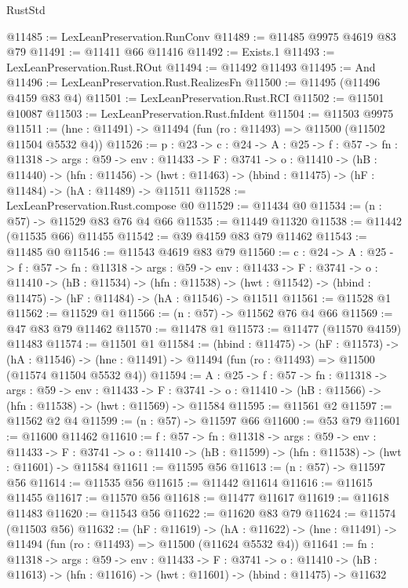 \begin{lexlean}{RustStd}
\begin{coremodule}
@11485 := LexLeanPreservation.RunConv
@11489 := @11485 @9975 @4619 @83 @79
@11491 := @11411 @66 @11416
@11492 := Exists.{1}
@11493 := LexLeanPreservation.Rust.ROut
@11494 := @11492 @11493
@11495 := And
@11496 := LexLeanPreservation.Rust.RealizesFn
@11500 := @11495 (@11496 @4159 @83 @4)
@11501 := LexLeanPreservation.Rust.RCI
@11502 := @11501 @10087
@11503 := LexLeanPreservation.Rust.fnIdent
@11504 := @11503 @9975
@11511 := (hne : @11491) -> @11494 (fun (ro : @11493) => @11500 (@11502 @11504 @5532 @4))
@11526 := {p : @23} ->
  {c : @24} ->
  {A : @25} ->
  {f : @57} ->
  {fn : @11318} ->
  {args : @59} ->
  {env : @11433} ->
  {F : @3741} ->
  {o : @11410} ->
  (hB : @11440) ->
  (hfn : @11456) -> (hwt : @11463) -> (hbind : @11475) -> (hF : @11484) -> (hA : @11489) -> @11511
@11528 := LexLeanPreservation.Rust.compose @0
@11529 := @11434 @0
@11534 := (n : @57) -> @11529 @83 @76 @4 @66
@11535 := @11449 @11320
@11538 := @11442 (@11535 @66) @11455
@11542 := @39 @4159 @83 @79 @11462
@11543 := @11485 @0
@11546 := @11543 @4619 @83 @79
@11560 := {c : @24} ->
  {A : @25} ->
  {f : @57} ->
  {fn : @11318} ->
  {args : @59} ->
  {env : @11433} ->
  {F : @3741} ->
  {o : @11410} ->
  (hB : @11534) ->
  (hfn : @11538) -> (hwt : @11542) -> (hbind : @11475) -> (hF : @11484) -> (hA : @11546) -> @11511
@11561 := @11528 @1
@11562 := @11529 @1
@11566 := (n : @57) -> @11562 @76 @4 @66
@11569 := @47 @83 @79 @11462
@11570 := @11478 @1
@11573 := @11477 (@11570 @4159) @11483
@11574 := @11501 @1
@11584 := (hbind : @11475) ->
  (hF : @11573) ->
  (hA : @11546) -> (hne : @11491) -> @11494 (fun (ro : @11493) => @11500 (@11574 @11504 @5532 @4))
@11594 := {A : @25} ->
  {f : @57} ->
  {fn : @11318} ->
  {args : @59} ->
  {env : @11433} ->
  {F : @3741} -> {o : @11410} -> (hB : @11566) -> (hfn : @11538) -> (hwt : @11569) -> @11584
@11595 := @11561 @2
@11597 := @11562 @2 @4
@11599 := (n : @57) -> @11597 @66
@11600 := @53 @79
@11601 := @11600 @11462
@11610 := {f : @57} ->
  {fn : @11318} ->
  {args : @59} ->
  {env : @11433} ->
  {F : @3741} -> {o : @11410} -> (hB : @11599) -> (hfn : @11538) -> (hwt : @11601) -> @11584
@11611 := @11595 @56
@11613 := (n : @57) -> @11597 @56
@11614 := @11535 @56
@11615 := @11442 @11614
@11616 := @11615 @11455
@11617 := @11570 @56
@11618 := @11477 @11617
@11619 := @11618 @11483
@11620 := @11543 @56
@11622 := @11620 @83 @79
@11624 := @11574 (@11503 @56)
@11632 := (hF : @11619) ->
  (hA : @11622) -> (hne : @11491) -> @11494 (fun (ro : @11493) => @11500 (@11624 @5532 @4))
@11641 := {fn : @11318} ->
  {args : @59} ->
  {env : @11433} ->
  {F : @3741} ->
  {o : @11410} -> (hB : @11613) -> (hfn : @11616) -> (hwt : @11601) -> (hbind : @11475) -> @11632

\end{coremodule}
\end{lexlean}

